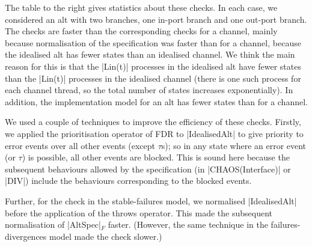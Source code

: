 \begin{window}
%
The table to the right gives statistics about these checks.  In each case, we
considered an alt with two branches, one in-port branch and one out-port
branch.  The checks are faster than the corresponding checks for a channel,
mainly because normalisation of the specification was
faster than for a channel, because the idealised alt has fewer states than an
idealised channel.  We think the main reason for this is that the |Lin(t)|
processes in the idealised alt have fewer states than the |Lin(t)| processes
in the idealised channel (there is one such process for each channel thread,
so the total number of states increases exponentially).  In addition, the
implementation model for an alt has fewer states than for a channel.
\end{window}

We used a couple of techniques to improve the efficiency of these checks.
Firstly, we applied the prioritisation operator of FDR to |IdealisedAlt| to
give priority to error events over all other events (except $\tau$s); so in
any state where an error event (or $\tau$) is possible, all other events are
blocked.  This is sound here because the subsequent behaviours allowed by the
specification (in |CHAOS(Interface)| or |DIV|) include the behaviours
corresponding to the blocked events.

Further, for the check in the stable-failures model, we normalised
|IdealisedAlt| before the application of the throws operator.  This made the
subsequent normalisation of |AltSpec|$_F$ faster.  (However, the same
technique in the failures-divergences model made the check slower.)

